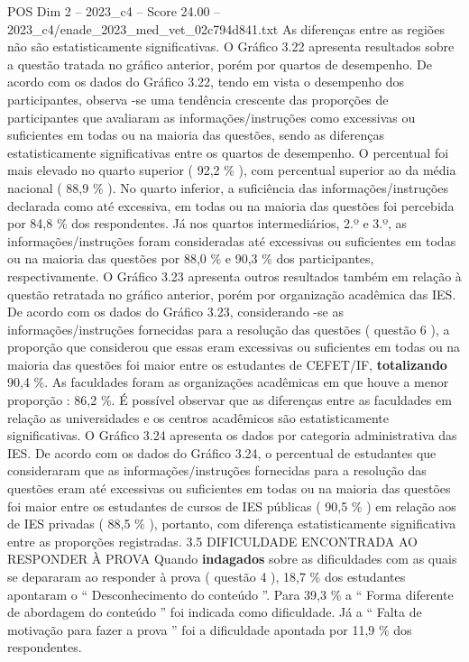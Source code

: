 \begin{textsample}{POS Dim 2 – 2023\_c4 – Score 24.00 – 2023\_c4/enade\_2023\_med\_vet\_02c794d841.txt}
As diferenças entre as regiões não são estatisticamente significativas.
O Gráfico 3.22 apresenta resultados sobre a questão tratada no gráfico anterior, porém por quartos de desempenho.
De acordo com os dados do Gráfico 3.22, tendo em vista o desempenho dos participantes, observa -se uma tendência crescente das proporções de participantes que avaliaram as informações/instruções como excessivas ou suficientes em todas ou na maioria das questões, sendo as diferenças estatisticamente significativas entre os quartos de desempenho.
O percentual foi mais elevado no quarto superior ( 92,2 \% ), com percentual superior ao da média nacional ( 88,9 \% ).
No quarto inferior, a suficiência das informações/instruções declarada como até excessiva, em todas ou na maioria das questões foi percebida por 84,8 \% dos respondentes.
Já nos quartos intermediários, 2.º e 3.º, as informações/instruções foram consideradas até excessivas ou suficientes em todas ou na maioria das questões por 88,0 \% e 90,3 \% dos participantes, respectivamente.
O Gráfico 3.23 apresenta outros resultados também em relação à questão retratada no gráfico anterior, porém por organização acadêmica das IES.
De acordo com os dados do Gráfico 3.23, considerando -se as informações/instruções fornecidas para a resolução das questões ( questão 6 ), a proporção que considerou que essas eram excessivas ou suficientes em todas ou na maioria das questões foi maior entre os estudantes de CEFET/IF, \textbf{totalizando} 90,4 \%.
As faculdades foram as organizações acadêmicas em que houve a menor proporção : 86,2 \%.
É possível observar que as diferenças entre as faculdades em relação as universidades e os centros acadêmicos são estatisticamente significativas.
O Gráfico 3.24 apresenta os dados por categoria administrativa das IES.
De acordo com os dados do Gráfico 3.24, o percentual de estudantes que consideraram que as informações/instruções fornecidas para a resolução das questões eram até excessivas ou suficientes em todas ou na maioria das questões foi maior entre os estudantes de cursos de IES públicas ( 90,5 \% ) em relação aos de IES privadas ( 88,5 \% ), portanto, com diferença estatisticamente significativa entre as proporções registradas. 3.5 DIFICULDADE ENCONTRADA AO RESPONDER À PROVA Quando \textbf{indagados} sobre as dificuldades com as quais se depararam ao responder à prova ( questão 4 ), 18,7 \% dos estudantes apontaram o “ Desconhecimento do conteúdo ”.
Para 39,3 \% a “ Forma diferente de abordagem do conteúdo ” foi indicada como dificuldade.
Já a “ Falta de motivação para fazer a prova ” foi a dificuldade apontada por 11,9 \% dos respondentes.

\end{textsample}
